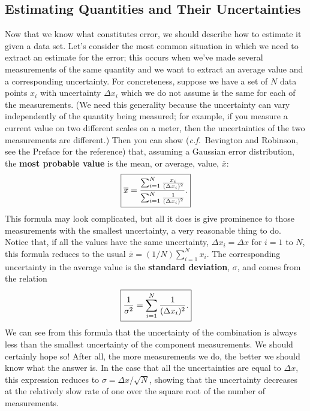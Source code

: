 \subsection{Estimating Quantities and Their Uncertainties}
\label{sec:intro:uncert}
Now that we know what constitutes error, we should describe how to estimate 
it given a data set. Let's consider the most common situation in which we 
need to extract an estimate for the error; this occurs when we've made several
measurements of the same quantity and we want to extract an average value and 
a corresponding uncertainty. For concreteness, suppose we have a set of $N$ 
data points $x_i$ with uncertainty $\Delta x_i$ which we do not assume is the 
same for each of the measurements. (We need this generality because the 
uncertainty can vary independently of  the quantity being measured; for 
example, if you measure a current value on two different scales on a meter, 
then the uncertainties of the two measurements are different.) Then you can 
show ({\it c.f.}~Bevington and Robinson, see the Preface for the reference) 
that, assuming a Gaussian error distribution, the {\bf most probable value} is the 
mean, or average, value, $\overline{x}$:
\begin{equation}
\fbox{$ \displaystyle \overline{x} = \frac{\sum^{N}_{i=1} \frac{x_i}{(\Delta x_i)^2}}
{ \sum^{N}_{i=1} \frac{1}{(\Delta x_i)^2}}. $}   \label{eq:intro:average}
\end{equation}
This formula may look complicated, but all it does is give prominence to those 
measurements with the smallest uncertainty, a very reasonable thing to do. 
Notice that, if all the values have the same uncertainty, $\Delta x_i = \Delta 
x$ for $i=1$ to $N$, this formula reduces to the usual $\overline{x} = (1/N) 
\sum^{N}_{i=1} x_i$.   The corresponding uncertainty in the average value is 
the {\bf standard deviation}, $\sigma$, and comes from  the relation
\begin{equation}
\fbox{$ \displaystyle \frac{1}{\sigma^2} = \sum_{i=1}^{N} \frac{1}{(\Delta x_i)^2}. $}
\label{eq:intro:standdev}
\end{equation}
We can see from this formula that the uncertainty of  the combination is 
always less than the smallest uncertainty of the component measurements. We 
should certainly hope so! After all, the more measurements we do, the better 
we should know what the answer is. In the case that all the uncertainties are 
equal to $\Delta x$, this expression reduces to $\sigma = \Delta x / 
\sqrt{N}$, showing that the uncertainty decreases at the relatively slow rate 
of one over the square root of the number of measurements.

